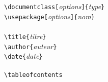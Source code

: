 \documentclass[11pt]{article}				%
\begin{document}
\noindent
\verb?\documentclass[?\emph{options}\verb?]{?\emph{type}\verb?}? \\
\verb?\usepackage[?\emph{options}\verb?]{?\emph{nom}\verb?}? \\
~\\ 
\verb?\title{?\emph{titre}\verb?}? \\
\verb?\author{?\emph{auteur}\verb?}? \\
\verb?\date{?\emph{date}\verb?}? \\
~\\ 
\verb?\tableofcontents? \\
\end{document}
